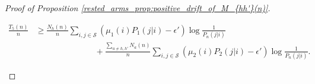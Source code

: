\begin{proof}[Proof of Proposition \ref{rested_arms_prop:positive_drift_of_M_{hh'}(n)}]
\begin{enumerate}
    \begingroup\allowdisplaybreaks\begin{align}
    	\frac{T_5(n)}{n}&\geq \frac{N_h(n)}{n}\sum\limits_{i,j\in\mathcal{S}}(\mu_1(i)P_1(j|i)-\epsilon')\log\frac{1}{P_n(j|i)}\nonumber\\
    	&\hspace{3cm}+\frac{\sum\limits_{a\neq h,h'}N_a(n)}{n}\sum\limits_{i,j\in\mathcal{S}}(\mu_2(i)P_2(j|i)-\epsilon')\log\frac{1}{P_n(j|i)}.\label{rested_arms_eq:liminf_t_5(n)/n_final}
    \end{align}\endgroup

\end{enumerate}
\end{proof}

